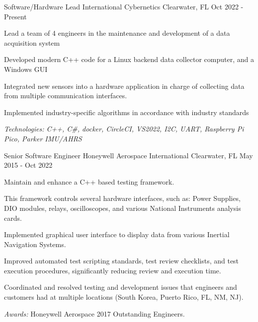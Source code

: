 

\begin{cventries}

  \cventry
    {Software/Hardware Lead} %
    {International Cybernetics} %
    {Clearwater, FL} %
    {Oct 2022 - Present} %
    {
      \begin{cvitems} %
        \item {Lead a team of 4 engineers in the maintenance and development of a data acquisition system}
        \item {Developed modern C++ code for a Linux backend data collector computer, and a Windows GUI}
        \item {Integrated new sensors into a hardware application in charge of collecting data from multiple communication interfaces.}
        \item {Implemented industry-specific algorithms in accordance with industry standards}
      \item {\it{Technologies:} C++, C\#, docker, CircleCI, VS2022, I2C, UART, Raspberry Pi Pico, Parker IMU/AHRS}
    \end{cvitems}
    }
  \cventry
    {Senior Software Engineer} %
    {Honeywell Aerospace International} %
    {Clearwater, FL} %
    {May 2015 - Oct 2022} %
    {
      \begin{cvitems} %
        \item {Maintain and enhance a C++ based testing framework.}
				\item {This framework controls several hardware interfaces, such as: Power Supplies, DIO modules, relays, oscilloscopes, and various National Instruments analysis cards.}
        \item {Implemented graphical user interface to display data from various Inertial Navigation Systems.}
				\item {Improved automated test scripting standards, test review checklists, and test execution procedures, significantly reducing review and execution time.}
        \item {Coordinated and resolved testing and development issues that engineers and customers had at multiple locations (South Korea, Puerto Rico, FL, NM, NJ).}
				\item {{\it Awards:} Honeywell Aerospace 2017 Outstanding Engineers.}
      \end{cvitems}
    }


\end{cventries}
